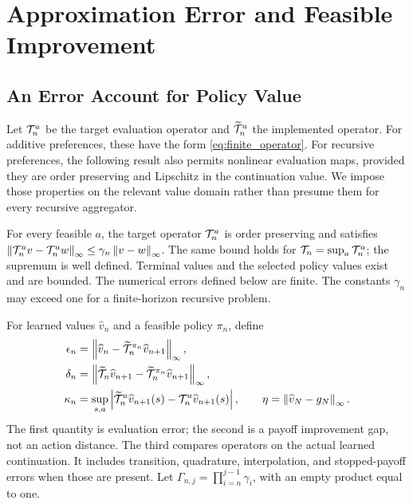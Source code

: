 \section{Approximation Error and Feasible Improvement}
\label{sec:error}
\subsection{An Error Account for Policy Value}
Let $\mathcal T_n^a$ be the target evaluation operator and $\widetilde{\mathcal T}_n^a$ the implemented operator. For additive preferences, these have the form \eqref{eq:finite_operator}. For recursive preferences, the following result also permits nonlinear evaluation maps, provided they are order preserving and Lipschitz in the continuation value. We impose those properties on the relevant value domain rather than presume them for every recursive aggregator.

\begin{assumption}
\label{ass:finite}
For every feasible $a$, the target operator $\mathcal T_n^a$ is order preserving and satisfies
$\left\lVert\mathcal T_n^a v-\mathcal T_n^a w\right\rVert_\infty\leq\gamma_n\left\lVert v-w\right\rVert_\infty$.
The same bound holds for $\mathcal T_n=\sup_a\mathcal T_n^a$; the supremum is well defined. Terminal values and the selected policy values exist and are bounded. The numerical errors defined below are finite. The constants $\gamma_n$ may exceed one for a finite-horizon recursive problem.
\end{assumption}

For learned values $\widehat v_n$ and a feasible policy $\pi_n$, define
\begin{align}
 \epsilon_n&=\left\lVert\widehat v_n-\widetilde{\mathcal T}_n^{\pi_n}\widehat v_{n+1}\right\rVert_\infty,
 \label{eq:eps}\\
 \delta_n&=\left\lVert\widetilde{\mathcal T}_n\widehat v_{n+1}
                  -\widetilde{\mathcal T}_n^{\pi_n}\widehat v_{n+1}\right\rVert_\infty,
 \label{eq:delta}\\
 \kappa_n&=\sup_{s,a}\left|\widetilde{\mathcal T}_n^a\widehat v_{n+1}(s)
                             -\mathcal T_n^a\widehat v_{n+1}(s)\right|,
 \qquad \eta=\left\lVert\widehat v_N-g_N\right\rVert_\infty.
 \label{eq:kappa}
\end{align}
The first quantity is evaluation error; the second is a payoff improvement gap, not an action distance. The third compares operators on the actual learned continuation. It includes transition, quadrature, interpolation, and stopped-payoff errors when those are present. Let $\Gamma_{n,j}=\prod_{i=n}^{j-1}\gamma_i$, with an empty product equal to one.

